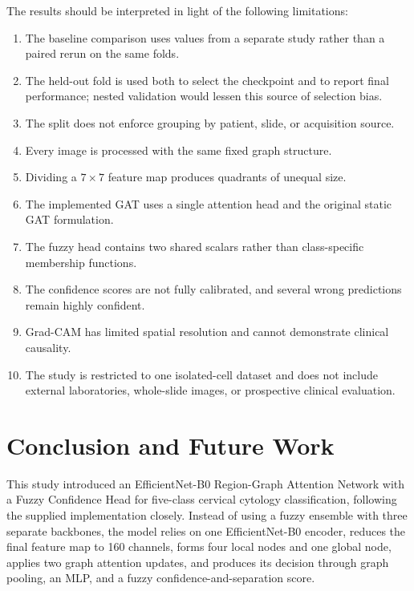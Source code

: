 \documentclass[10pt,conference]{IEEEtran}
\begin{document}
The results should be interpreted in light of the following limitations:
\begin{enumerate}
    \item The baseline comparison uses values from a separate study rather than a paired rerun on the same folds.
    \item The held-out fold is used both to select the checkpoint and to report final performance; nested validation would lessen this source of selection bias.
    \item The split does not enforce grouping by patient, slide, or acquisition source.
    \item Every image is processed with the same fixed graph structure.
    \item Dividing a $7\times7$ feature map produces quadrants of unequal size.
    \item The implemented GAT uses a single attention head and the original static GAT formulation.
    \item The fuzzy head contains two shared scalars rather than class-specific membership functions.
    \item The confidence scores are not fully calibrated, and several wrong predictions remain highly confident.
    \item Grad-CAM has limited spatial resolution and cannot demonstrate clinical causality.
    \item The study is restricted to one isolated-cell dataset and does not include external laboratories, whole-slide images, or prospective clinical evaluation.
\end{enumerate}

\FloatBarrier

\section{Conclusion and Future Work}

This study introduced an EfficientNet-B0 Region-Graph Attention Network with a Fuzzy Confidence Head for five-class cervical cytology classification, following the supplied implementation closely. Instead of using a fuzzy ensemble with three separate backbones, the model relies on one EfficientNet-B0 encoder, reduces the final feature map to 160 channels, forms four local nodes and one global node, applies two graph attention updates, and produces its decision through graph pooling, an MLP, and a fuzzy confidence-and-separation score.
\end{document}

